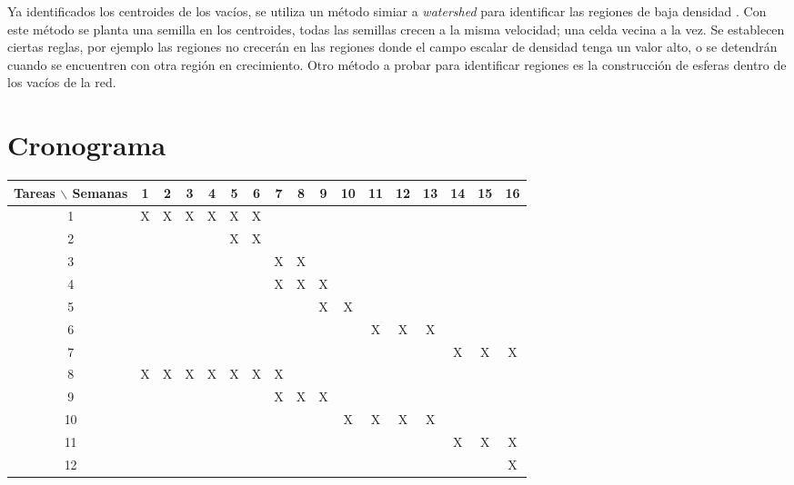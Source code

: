 \documentclass[preprint]{aastex62}
\begin{document}
  Ya identificados los centroides de los vacíos, se utiliza un método simiar a \textit{watershed}
  para identificar las regiones de baja densidad \citep{Sutter2015}. Con este método
  se planta una semilla en los centroides, todas las semillas crecen a la misma velocidad; una
  celda vecina a la vez. Se establecen ciertas reglas, por ejemplo las regiones no crecerán en
  las regiones donde el campo escalar de densidad tenga un valor alto, o se detendrán cuando
  se encuentren con otra región en crecimiento. Otro método a probar para identificar regiones
  es la construcción de esferas dentro de los vacíos de la red. 

  \section{Cronograma}

  \begin{table}[htb]
    \begin{tabular}{|c|cccccccccccccccc| }
      \hline
      Tareas $\backslash$ Semanas & 1 & 2 & 3 & 4 & 5 & 6 & 7 & 8 & 9 & 10 & 11 & 12 & 13 & 14 & 15 & 16  \\
      \hline
      1 & X & X & X & X & X & X &   &   &   &   &   &   &   &   &   &   \\
      2 &   &   &   &   & X & X &   &   &   &   &   &   &   &   &   &   \\
      3 &   &   &   &   &   &   & X & X &   &   &   &   &   &   &   &   \\
      4 &   &   &   &   &   &   & X & X & X &   &   &   &   &   &   &   \\
      5 &   &   &   &   &   &   &   &   & X & X &   &   &   &   &   &   \\
      6 &   &   &   &   &   &   &   &   &   &   & X & X & X &   &   &   \\
      7 &   &   &   &   &   &   &   &   &   &   &   &   &   & X & X & X \\
      8 & X & X & X & X & X & X & X &   &   &   &   &   &   &   &   &   \\
      9 &   &   &   &   &   &   & X & X & X &   &   &   &   &   &   &   \\
      10&   &   &   &   &   &   &   &   &   & X & X & X & X &   &   &   \\
      11&   &   &   &   &   &   &   &   &   &   &   &   &   & X & X & X \\
      12&   &   &   &   &   &   &   &   &   &   &   &   &   &   &   & X \\
      \hline
    \end{tabular}
  \end{table}
\end{document}
